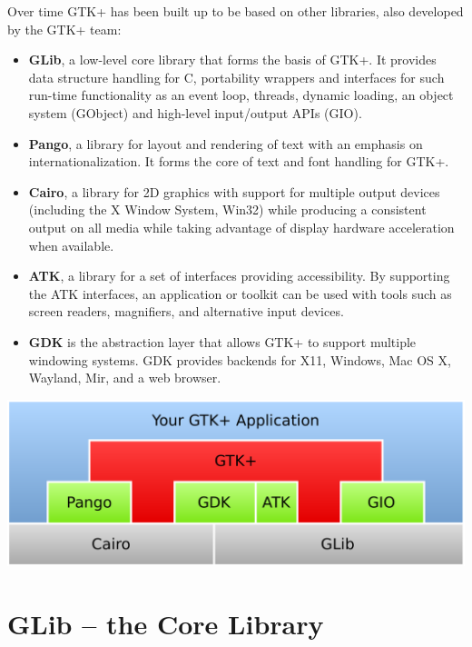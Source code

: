 \documentclass[a4paper,notumble]{leaflet}
\begin{document}
Over time GTK+ has been built up to be based on other libraries, also developed by the GTK+ team:
\begin{itemize}
  \item \textbf{GLib}, a low-level core library that forms the basis of GTK+. It provides data structure handling for C, portability wrappers and interfaces for such run-time functionality as an event loop, threads, dynamic loading, an object system (GObject) and high-level input/output APIs (GIO).

  \item \textbf{Pango}, a library for layout and rendering of text with an emphasis on internationalization. It forms the core of text and font handling for GTK+.

  \item \textbf{Cairo}, a library for 2D graphics with support for multiple output devices (including the X Window System, Win32) while producing a consistent output on all media while taking advantage of display hardware acceleration when available.

  \item \textbf{ATK}, a library for a set of interfaces providing accessibility. By supporting the ATK interfaces, an application or toolkit can be used with tools such as screen readers, magnifiers, and alternative input devices.

  \item \textbf{GDK} is the abstraction layer that allows GTK+ to support multiple windowing systems. GDK provides backends for X11, Windows, Mac OS X, Wayland, Mir, and a web browser.
\end{itemize}

\vspace{1cm}
\includegraphics[width=\textwidth]{images/architecture.pdf}

\pagebreak
\section{GLib -- the Core Library}
\end{document}
